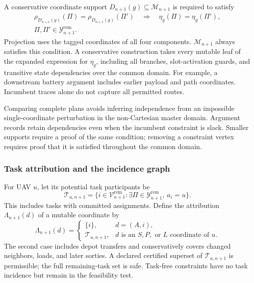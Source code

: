 A conservative coordinate support $D_{n+1}(g)\subseteq\mathcal M_{n+1}$
is required to satisfy
\begin{equation}
\begin{split}
\rho_{D_{n+1}(g)}(\Pi)=\rho_{D_{n+1}(g)}(\Pi')
\quad\Longrightarrow\quad\eta_g(\Pi)=\eta_g(\Pi'),\\
\Pi,\Pi'\in\mathcal Y_{n+1}^{\mathrm{rem}}.
\end{split}
\label{eq:constraint_coordinate_support}
\end{equation}
Projection uses the tagged coordinates of all four components.
$\mathcal M_{n+1}$ always satisfies this condition. A conservative
construction takes every mutable leaf of the expanded expression for
$\eta_g$, including all branches, slot-activation guards, and transitive
state dependencies over the common domain. For example, a downstream
battery argument includes earlier payload and path coordinates.
Incumbent traces alone do not capture all permitted routes.

Comparing complete plans avoids inferring independence from an impossible
single-coordinate perturbation in the non-Cartesian master domain.
Argument records retain dependencies even when the incumbent constraint
is slack. Smaller supports require a proof of the same condition; removing
a constraint vertex requires proof that it is satisfied throughout the
common domain.

\subsubsection{Task attribution and the incidence graph}
For UAV $u$, let its potential task participants be
\begin{equation}
\mathcal T_{u,n+1}=\{i\in\mathcal V_{n+1}^{\mathrm{rem}}:
\exists\Pi\in\mathcal Y_{n+1}^{\mathrm{rem}},\ a_i=u\}.
\label{eq:potential_task_participants}
\end{equation}
This includes tasks with committed assignments. Define the attribution
$\Lambda_{n+1}(d)$ of a mutable coordinate by
\begin{equation}
\Lambda_{n+1}(d)=
\begin{cases}
\{i\},&d=(A,i),\\
\mathcal T_{u,n+1},&d\text{ is an }S,P,\text{ or }L
\text{ coordinate of }u.
\end{cases}
\label{eq:coordinate_task_attribution}
\end{equation}
The second case includes depot transfers and conservatively covers changed
neighbors, loads, and later sorties. A declared certified superset of
$\mathcal T_{u,n+1}$ is permissible; the full remaining-task set is safe.
Task-free constraints have no task incidence but remain in the feasibility
test.

